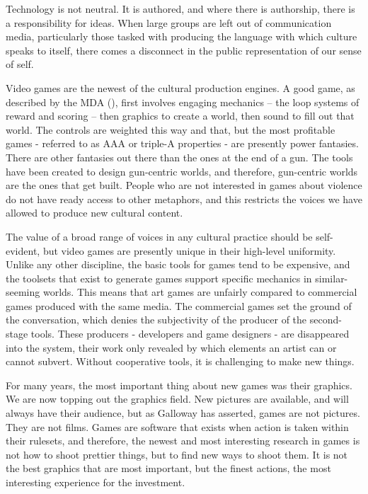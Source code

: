 Technology is not neutral. It is authored, and where there is authorship, there is a responsibility for ideas. When large groups are left out of communication media, particularly those tasked with producing the language with which culture speaks to itself, there comes a disconnect in the public representation of our sense of self. 

Video games are the newest of the cultural production engines. A good game, as described by the MDA (\cite{mda}), first involves engaging mechanics – the loop systems of reward and scoring – then graphics to create a world, then sound to fill out that world. The controls are weighted this way and that, but the most profitable games - referred to as AAA or triple-A properties - are presently power fantasies. There are other fantasies out there than the ones at the end of a gun. The tools have been created to design gun-centric worlds, and therefore, gun-centric worlds are the ones that get built. People who are not interested in games about violence do not have ready access to other metaphors, and this restricts the voices we have allowed to produce new cultural content.

The value of a broad range of voices in any cultural practice should be self-evident, but video games are presently unique in their high-level uniformity. Unlike any other discipline, the basic tools for games tend to be expensive, and the toolsets that exist to generate games support specific mechanics in similar-seeming worlds. This means that art games are unfairly compared to commercial games produced with the same media. The commercial games set the ground of the conversation, which denies the subjectivity of the producer of the second-stage tools. These producers - developers and game designers - are disappeared into the system, their work only revealed by which elements an artist can or cannot subvert. Without cooperative tools, it is challenging to make new things.

For many years, the most important thing about new games was their graphics. We are now topping out the graphics field. New pictures are available, and will always have their audience, but as Galloway has asserted, games are not pictures. They are not films. Games are software that exists when action is taken within their rulesets, and therefore, the newest and most interesting research in games is not how to shoot prettier things, but to find new ways to shoot them. It is not the best graphics that are most important, but the finest actions, the most interesting experience for the investment.

